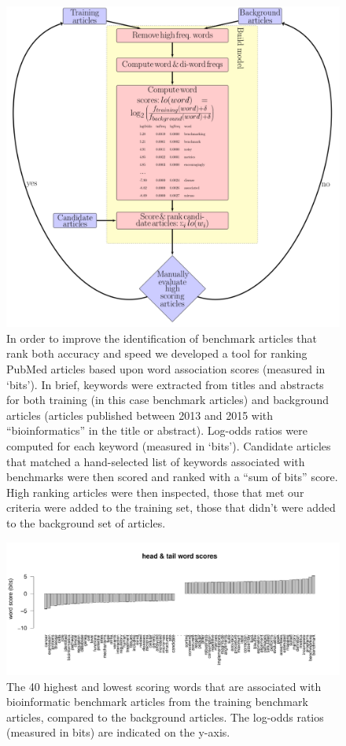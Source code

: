 \documentclass[fleqn,10pt]{SelfArx} %
\begin{document}
\begin{figure}[H]
\centering
\includegraphics[height=0.7\textheight]{litMiningFlowDiagram-edited.pdf}
\caption{In order to improve the identification of benchmark articles
  that rank both accuracy and speed we developed a tool for ranking
  PubMed articles based upon word association scores (measured in
  ‘bits’). In brief, keywords were extracted from titles and abstracts
  for both training (in this case benchmark articles) and background
  articles (articles published between 2013 and 2015 with
  “bioinformatics” in the title or abstract). Log-odds ratios were
  computed for each keyword (measured in ‘bits’). Candidate articles
  that matched a hand-selected list of keywords associated with
  benchmarks were then scored and ranked with a “sum of bits”
  score. High ranking articles were then inspected, those that met our
  criteria were added to the training set, those that didn’t were
  added to the background set of articles.}
\label{fig:flow}
\end{figure}



\begin{figure}[H] \centering
\includegraphics[width=1.05\textwidth]{wordScores.pdf} \caption{The 40
  highest and lowest scoring words that are associated with
  bioinformatic benchmark articles from the training benchmark articles,
  compared to the background articles. The log-odds ratios (measured
  in bits) are indicated on the y-axis. }
\label{fig:wordScores} \end{figure}
\end{document}

